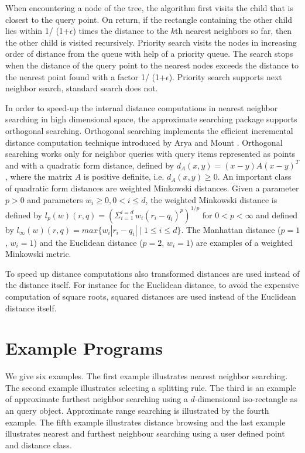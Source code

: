 When encountering a node of the tree, the algorithm first visits the
child that is closest to the query point. On return, if the rectangle
containing the other child lies within 1/ (1+$\epsilon$) times the
distance to the $k$th nearest neighbors so far, then the other child
is visited recursively.  Priority search \cite{am-annqf-93} visits the
nodes in increasing order of distance from the queue with help of a
priority queue.  The search stops when the distance of the query point
to the nearest nodes exceeds the distance to the nearest point found
with a factor 1/ (1+$\epsilon$).  Priority search supports next
neighbor search, standard search does not.

In order to speed-up the internal distance computations in nearest
neighbor searching in high dimensional space, the approximate
searching package supports orthogonal searching. Orthogonal searching
implements the efficient incremental distance computation technique
introduced by Arya and Mount \cite{am-afvq-93}.  Orthogonal searching
works only for neighbor queries with query items represented as points
and with a quadratic form distance, defined by $d_A(x,y)=
(x-y)A(x-y)^T$, where the matrix $A$ is positive definite,
i.e. $d_A(x,y) \geq 0$.  An important class of quadratic form
distances are weighted Minkowski distances.  Given a parameter $p>0$
and parameters $w_i \geq 0, 0 < i \leq d$, the weighted Minkowski
distance is defined by $l_p(w)(r,q)= ({\Sigma_{i=1}^{i=d} \,
w_i(r_i-q_i)^p})^{1/p}$ for $0 < p <\infty$ and defined by
$l_{\infty}(w)(r,q)=max \{w_i |r_i-q_i| \mid 1 \leq i \leq d\}$.  The
Manhattan distance ($p=1$, $w_i=1$) and the Euclidean distance ($p=2$,
$w_i=1$) are examples of a weighted Minkowski metric.

To speed up distance computations also transformed distances are used
instead of the distance itself.  For instance for the Euclidean
distance, to avoid the expensive computation of square roots, squared
distances are used instead of the Euclidean distance itself.


\section{Example Programs}

We give six examples.  The first example illustrates nearest neighbor
searching.  The second example illustrates selecting a splitting rule.
The third is an example of approximate furthest neighbor searching
using a $d$-dimensional iso-rectangle as an query object.  Approximate
range searching is illustrated by the fourth example.  The fifth
example illustrates distance browsing and the last example illustrates
nearest and furthest neighbour searching using a user defined point
and distance class.

